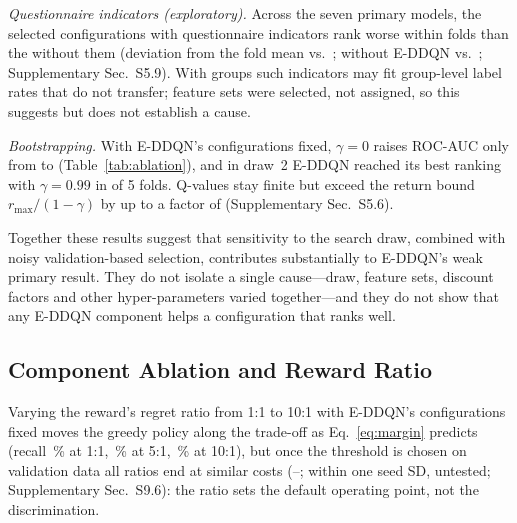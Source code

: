 \emph{Questionnaire indicators (exploratory).} Across the seven primary models, the \PHFsProfile{} selected configurations with questionnaire indicators rank worse within folds than the \PHFsNoProfile{} without them (deviation from the fold mean \PHFsDevProfile{} vs.\ \PHFsDevNoProfile; without E-DDQN \PHFsDevProfileExE{} vs.\ \PHFsDevNoProfileExE; Supplementary Sec.~S5.9). With \nGroupsEval{} groups such indicators may fit group-level label rates that do not transfer; feature sets were selected, not assigned, so this suggests but does not establish a cause.

\emph{Bootstrapping.} With E-DDQN's configurations fixed, $\gamma=0$ raises ROC-AUC only from \EDDQNCostRocAucMean{} to \AblGammaZeroCostRocAuc{} (Table~\ref{tab:ablation}), and in draw~2 E-DDQN reached its best ranking with $\gamma=0.99$ in \SDEDDQNDrawTwoStrongGammaFolds{} of 5 folds. Q-values stay finite but exceed the return bound $r_{\max}/(1-\gamma)$ by up to a factor of \PHQRatioMaxEDDQN{} (Supplementary Sec.~S5.6).

Together these results suggest that sensitivity to the search draw, combined with noisy validation-based selection, contributes substantially to E-DDQN's weak primary result. They do not isolate a single cause---draw, feature sets, discount factors and other hyper-parameters varied together---and they do not show that any E-DDQN component helps a configuration that ranks well.

\subsection{Component Ablation and Reward Ratio}
\label{sec:ablation}

Varying the reward's regret ratio from 1:1 to 10:1 with E-DDQN's configurations fixed moves the greedy policy along the trade-off as Eq.~\eqref{eq:margin} predicts (recall \RatioArgOneRecall\,\% at 1:1, \RatioArgFiveRecall\,\% at 5:1, \RatioArgOneZeroRecall\,\% at 10:1), but once the threshold is chosen on validation data all ratios end at similar costs (\RatioTunedOneCost--\RatioTunedOneZeroCost; within one seed SD, untested; Supplementary Sec.~S9.6): the ratio sets the default operating point, not the discrimination.


